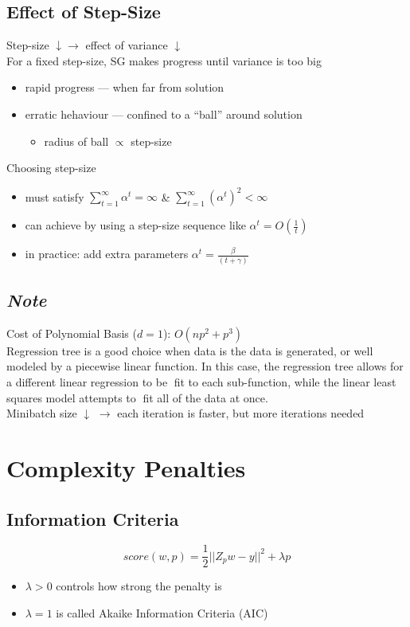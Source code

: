 \documentclass[10pt,landscape,a4paper]{article}
\begin{document}
\begin{multicols*}{5}
\subsection{Effect of Step-Size}
Step-size \(\downarrow \rightarrow \) effect of variance \(\downarrow \) \\
For a fixed step-size, SG makes progress until variance is too big
\begin{itemize}
    \item rapid progress --- when far from solution
    \item erratic hehaviour --- confined to a ``ball'' around solution
    \begin{itemize}
        \item radius of ball \(\propto \) step-size
    \end{itemize}
\end{itemize}
Choosing step-size
\begin{itemize}
    \item must satisfy \(\sum_{t=1}^{\infty} \alpha^t = \infty\) \& \(\sum_{t=1}^{\infty} (\alpha^t)^2 < \infty\)
    \item can achieve by using a step-size sequence like \(\alpha^t = O(\frac{1}{t})\)
    \item in practice: add extra parameters \(\alpha^t = \frac{\beta}{(t+\gamma)}\)
\end{itemize}

\subsection{\emph{Note}}
Cost of Polynomial Basis (\(d = 1\)): \(O(np^2+p^3)\) \\
Regression tree is a good choice when data is the data is generated, or well modeled by a piecewise linear function. In this case, the regression tree allows for a different linear regression to be fit to each sub-function, while the linear least squares model attempts to fit all of the data at once. \\
Minibatch size \(\downarrow \) \(\rightarrow \) each iteration is faster, but more iterations needed

\section{Complexity Penalties}

\subsection{Information Criteria}
\begin{dmath*}
    score(w,p) = \frac{1}{2} ||Z_p w - y||^2 + \lambda p
\end{dmath*}
\begin{itemize}
    \item \(\lambda > 0\) controls how strong the penalty is
    \item \(\lambda = 1\) is called Akaike Information Criteria (AIC)
\end{itemize}


\end{multicols*}
\end{document}
